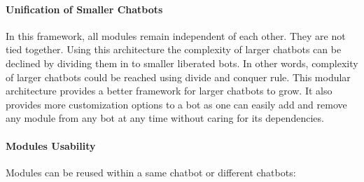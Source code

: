 \paragraph*{Unification of Smaller Chatbots}
In this framework, all modules remain independent of each other. They are not tied together. Using this architecture the complexity of larger chatbots can be declined by dividing them in to smaller liberated bots. In other words, complexity of larger chatbots could be reached using divide and conquer rule. This modular architecture provides a better framework for larger chatbots to grow. It also provides more customization options to a bot as one can easily add and remove any module from any bot at any time without caring for its dependencies.

\paragraph*{Modules Usability}
Modules can be reused within a same chatbot or different chatbots:

